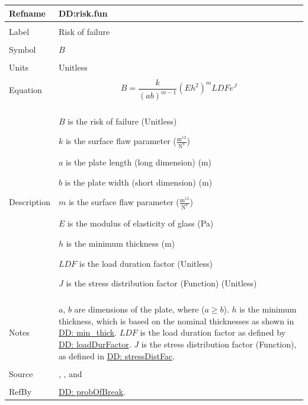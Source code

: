 \documentclass[12pt]{article}
\begin{document}
\noindent \begin{minipage}{\textwidth}
\begin{tabular}{p{} p{}}
\toprule \textbf{Refname} & \textbf{DD:risk.fun}
\label{DD:risk.fun}
\\ \midrule \\
Label & Risk of failure
\\ \midrule \\
Symbol & $B$
\\ \midrule \\
Units & Unitless
\\ \midrule \\
Equation & \begin{displaymath}
           B=\frac{k}{\left(a b\right)^{m-1}} \left(E h^{2}\right)^{m} LDF e^{J}
           \end{displaymath}
\\ \midrule \\
Description & \begin{symbDescription}
              \item{$B$ is the risk of failure (Unitless)}
              \item{$k$ is the surface flaw parameter ($\frac{\text{m}^{12}}{\text{N}^{7}}$)}
              \item{$a$ is the plate length (long dimension) (m)}
              \item{$b$ is the plate width (short dimension) (m)}
              \item{$m$ is the surface flaw parameter ($\frac{\text{m}^{12}}{\text{N}^{7}}$)}
              \item{$E$ is the modulus of elasticity of glass (Pa)}
              \item{$h$ is the minimum thickness (m)}
              \item{$LDF$ is the load duration factor (Unitless)}
              \item{$J$ is the stress distribution factor (Function) (Unitless)}
              \end{symbDescription}
\\ \midrule \\
Notes & $a$, $b$ are dimensions of the plate, where ($a\geq{}b$).
        $h$ is the minimum thickness, which is based on the nominal thicknesses as shown in \hyperref[DD:min.thick]{DD: min\_thick}.
        $LDF$ is the load duration factor as defined by \hyperref[DD:loadDurFactor]{DD: loadDurFactor}.
        $J$ is the stress distribution factor (Function), as defined in \hyperref[DD:stressDistFac]{DD: stressDistFac}.
\\ \midrule \\
Source & \cite{astm2009}, \cite{beasonEtAl1998}, and \cite{campidelli}
\\ \midrule \\
RefBy & \hyperref[DD:probOfBreak]{DD: probOfBreak}.
\\ \bottomrule \end{tabular}
\end{minipage}
\par~
\end{document}
